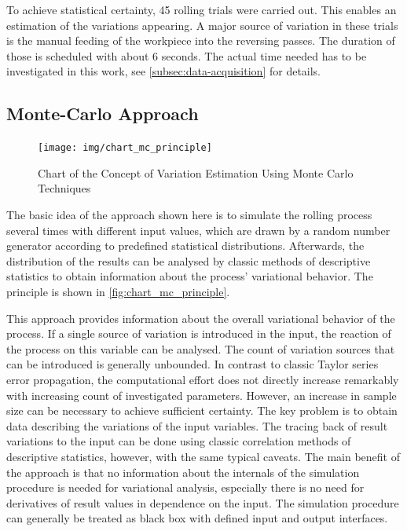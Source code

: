 To achieve statistical certainty, 45 rolling trials were carried out.
This enables an estimation of the variations appearing.
A major source of variation in these trials is the manual feeding of the workpiece into the reversing passes.
The duration of those is scheduled with about 6 seconds.
The actual time needed has to be investigated in this work, see \autoref{subsec:data-acquisition} for details.

\subsection{Monte-Carlo Approach}\label{subsec:monte-carlo-approach}

\begin{figure}
    \centering
    \texttt{[image: img/chart\_mc\_principle]}
    \caption{Chart of the Concept of Variation Estimation Using Monte Carlo Techniques}
    \label{fig:chart_mc_principle}
\end{figure}

The basic idea of the approach shown here is to simulate the rolling process several times with different input values, which are drawn by a random number generator according to predefined statistical distributions.
Afterwards, the distribution of the results can be analysed by classic methods of descriptive statistics to obtain information about the process' variational behavior.
The principle is shown in \autoref{fig:chart_mc_principle}.

This approach provides information about the overall variational behavior of the process.
If a single source of variation is introduced in the input, the reaction of the process on this variable can be analysed.
The count of variation sources that can be introduced is generally unbounded.
In contrast to classic Taylor series error propagation, the computational effort does not directly increase remarkably with increasing count of investigated parameters.
However, an increase in sample size can be necessary to achieve sufficient certainty.
The key problem is to obtain data describing the variations of the input variables.
The tracing back of result variations to the input can be done using classic correlation methods of descriptive statistics, however, with the same typical caveats.
The main benefit of the approach is that no information about the internals of the simulation procedure is needed for variational analysis, especially there is no need for derivatives of result values in dependence on the input.
The simulation procedure can generally be treated as black box with defined input and output interfaces.

